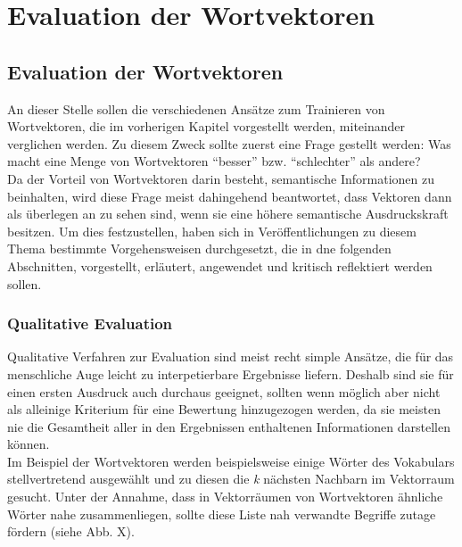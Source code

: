 
\chapter{Evaluation der Wortvektoren} %

\label{Chapter5} %


\section{Evaluation der Wortvektoren}

An dieser Stelle sollen die verschiedenen Ansätze zum Trainieren von Wortvektoren, die im vorherigen Kapitel
vorgestellt werden, miteinander verglichen werden. Zu diesem Zweck sollte zuerst eine Frage gestellt werden:
Was macht eine Menge von Wortvektoren ``besser'' bzw. ``schlechter'' als andere?\\
Da der Vorteil von Wortvektoren darin besteht, semantische Informationen zu beinhalten, wird diese
Frage meist dahingehend beantwortet, dass Vektoren dann als überlegen an zu sehen sind, wenn sie
eine höhere semantische Ausdruckskraft besitzen. Um dies festzustellen, haben sich in Veröffentlichungen
zu diesem Thema bestimmte Vorgehensweisen durchgesetzt, die in dne folgenden Abschnitten, vorgestellt, erläutert,
angewendet und kritisch reflektiert werden sollen.\\

  \subsection{Qualitative Evaluation}

  Qualitative Verfahren zur Evaluation sind meist recht simple Ansätze, die für das menschliche
  Auge leicht zu interpetierbare Ergebnisse liefern. Deshalb sind sie für einen ersten Ausdruck
  auch durchaus geeignet, sollten wenn möglich aber nicht als alleinige Kriterium für eine Bewertung
  hinzugezogen werden, da sie meisten nie die Gesamtheit aller in den Ergebnissen enthaltenen
  Informationen darstellen können. \\
  Im Beispiel der Wortvektoren werden beispielsweise einige Wörter des Vokabulars stellvertretend ausgewählt
  und zu diesen die \emph{k} nächsten Nachbarn im Vektorraum gesucht. Unter der Annahme, dass
  in Vektorräumen von Wortvektoren ähnliche Wörter nahe zusammenliegen, sollte diese Liste nah verwandte
  Begriffe zutage fördern (siehe Abb. X).\\

